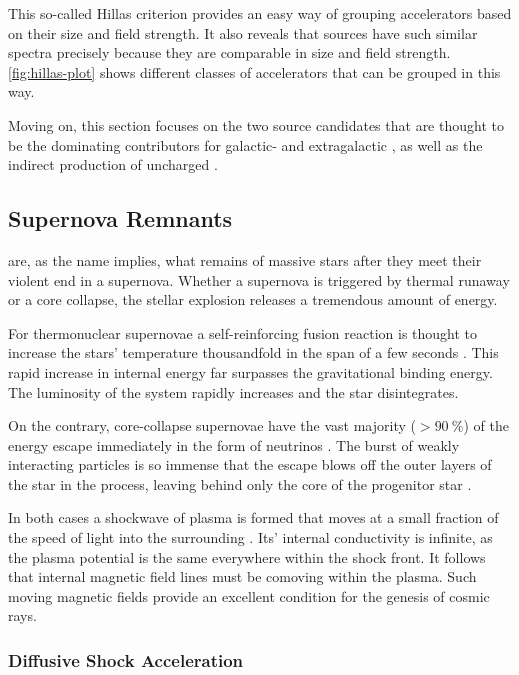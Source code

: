 This so-called Hillas criterion provides an easy way of grouping accelerators 
based on their size and field strength. It also reveals that \CR sources have
such similar spectra precisely because they are comparable in size and field 
strength. \cref{fig:hillas-plot} shows different classes of \CR accelerators 
that can be grouped in this way. 

Moving on, this section focuses on the two source candidates that are thought 
to be the dominating contributors for galactic- and extragalactic \CRs, as well
as the indirect production of uncharged \CRs.

\subsection{Supernova Remnants}
\label{ssec:supernova-remnants}

\SNRs are, as the name implies, what remains of massive stars after they meet 
their violent end in a supernova. Whether a supernova is triggered by thermal 
runaway or a core collapse, the stellar explosion releases a tremendous amount 
of energy.

For thermonuclear supernovae a self-reinforcing fusion reaction is thought to 
increase the stars' temperature thousandfold in the span of a few seconds 
\cite{khokhlovLightCurvesType1993}. This rapid increase in internal energy far
surpasses the gravitational binding energy. The luminosity of the system 
rapidly increases and the star disintegrates.

On the contrary, core-collapse supernovae have the vast majority
($>\SI{90}{\percent}$) of the energy escape immediately in the form of 
neutrinos \cite{odrzywolekProbingThermonuclearSupernova2011}. The burst of 
weakly interacting particles is so immense that the escape blows off the outer 
layers of the star in the process, leaving behind only the core of the 
progenitor star \cite{walchEnergyMomentumInput2015}.

In both cases a shockwave of plasma is formed that moves at a small fraction
of the speed of light into the surrounding \ISM. Its' internal conductivity is 
infinite, as the plasma potential is the same everywhere within the shock 
front. It follows that internal magnetic field lines must be comoving within 
the plasma. Such moving magnetic fields provide an excellent condition for the 
genesis of cosmic rays.

\subsubsection{Diffusive Shock Acceleration}

